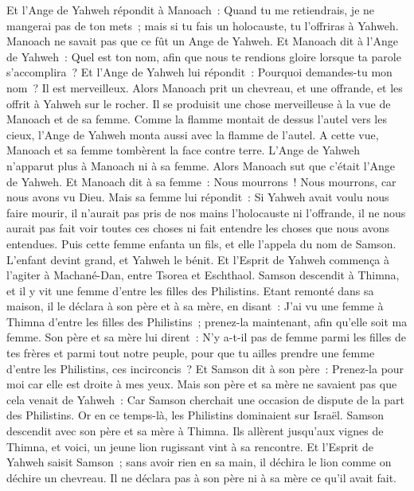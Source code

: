 \begin{multicols}{2}
Et l'Ange de Yahweh répondit à Manoach~: Quand tu me retiendrais, je ne mangerai pas de ton mets~; mais si tu fais un holocauste, tu l'offriras à Yahweh. Manoach ne savait pas que ce fût un Ange de Yahweh.
Et Manoach dit à l'Ange de Yahweh~: Quel est ton nom, afin que nous te rendions gloire lorsque ta parole s'accomplira~?
Et l'Ange de Yahweh lui répondit~: Pourquoi demandes-tu mon nom~? Il est merveilleux.
Alors Manoach prit un chevreau, et une offrande, et les offrit à Yahweh sur le rocher. Il se produisit une chose merveilleuse à la vue de Manoach et de sa femme.
Comme la flamme montait de dessus l'autel vers les cieux, l'Ange de Yahweh monta aussi avec la flamme de l'autel. A cette vue, Manoach et sa femme tombèrent la face contre terre.
L'Ange de Yahweh n'apparut plus à Manoach ni à sa femme. Alors Manoach sut que c'était l'Ange de Yahweh.
Et Manoach dit à sa femme~: Nous mourrons~! Nous mourrons, car nous avons vu Dieu.
Mais sa femme lui répondit~: Si Yahweh avait voulu nous faire mourir, il n'aurait pas pris de nos mains l'holocauste ni l'offrande, il ne nous aurait pas fait voir toutes ces choses ni fait entendre les choses que nous avons entendues.
Puis cette femme enfanta un fils, et elle l'appela du nom de Samson. L'enfant devint grand, et Yahweh le bénit.
Et l'Esprit de Yahweh commença à l'agiter à Machané-Dan, entre Tsorea et Eschthaol.
\VerseOne{}Samson descendit à Thimna, et il y vit une femme d'entre les filles des Philistins.
Etant remonté dans sa maison, il le déclara à son père et à sa mère, en disant~: J'ai vu une femme à Thimna d'entre les filles des Philistins~; prenez-la maintenant, afin qu'elle soit ma femme.
Son père et sa mère lui dirent~: N'y a-t-il pas de femme parmi les filles de tes frères et parmi tout notre peuple, pour que tu ailles prendre une femme d'entre les Philistins, ces incirconcis~? Et Samson dit à son père~: Prenez-la pour moi car elle est droite à mes yeux.
Mais son père et sa mère ne savaient pas que cela venait de Yahweh~: Car Samson cherchait une occasion de dispute de la part des Philistins. Or en ce temps-là, les Philistins dominaient sur Israël.
Samson descendit avec son père et sa mère à Thimna. Ils allèrent jusqu'aux vignes de Thimna, et voici, un jeune lion rugissant vint à sa rencontre.
Et l'Esprit de Yahweh saisit Samson~; sans avoir rien en sa main, il déchira le lion comme on déchire un chevreau. Il ne déclara pas à son père ni à sa mère ce qu'il avait fait.

\end{multicols}
